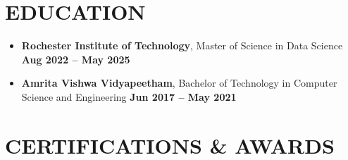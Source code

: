 \documentclass[10pt,letter]{article}
\newcommand{\boldlarger}[1]{\textbf{\normalsize #1}}
\begin{document}
\section*{EDUCATION}
\begin{itemize}

\item \boldlarger{Rochester Institute of Technology}, Master of Science in Data Science \hfill \boldlarger{Aug 2022 -- May 2025}

   \item \boldlarger{Amrita Vishwa Vidyapeetham}, 
  Bachelor of Technology in Computer Science and Engineering \hfill \boldlarger{Jun 2017 -- May 2021}
\end{itemize}



 \vspace{-4pt}
\section*{CERTIFICATIONS \& AWARDS}


\end{document}
